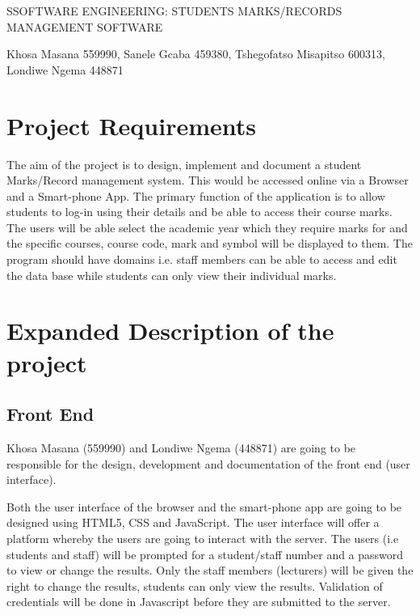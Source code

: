 \documentclass[10pt,onecolumn]{lab1}
\begin{document}
\begin{title}
SSOFTWARE ENGINEERING: STUDENTS MARKS/RECORDS MANAGEMENT SOFTWARE

Khosa Masana 559990, Sanele Gcaba 459380, Tshegofatso Misapitso 600313, Londiwe Ngema 448871
\end{title}







%
\section{Project Requirements}

The aim of the project is to design, implement and document a student Marks/Record management system. This would be accessed online via a Browser and a Smart-phone App. The primary function of the application is to allow students to log-in using their details and be able to access their course marks. The users will be able select the academic year which they require marks for and the specific courses, course code, mark and symbol will be displayed to them. The program should have domains i.e. staff members can be able to access and edit the data base while students can only view their individual marks.

%
\section{Expanded Description of the project}

\subsection{Front End}

Khosa Masana (559990) and Londiwe Ngema (448871) are going to be responsible for the design, development and documentation of the front end (user interface).


Both the user interface of the browser and the smart-phone app are going to be designed using HTML5, CSS and JavaScript. The user interface will offer a platform whereby the users are going to interact with the server. The users (i.e students and staff) will be prompted for a student/staff number and a password to view or change the results. Only the staff members (lecturers) will be given the right to change the results, students can only view the results. Validation of credentials will be done in Javascript before they are submitted to the server.  
\end{document}

